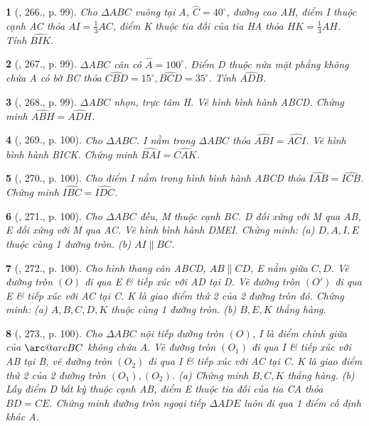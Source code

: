 \documentclass{article}
\makeatletter
\newcommand{\arc@char}{{\usefont{U}{tipa}{m}{n}\symbol{62}}}%
\newcommand{\arc}[1]{\mathpalette\arc@arc{#1}}
\newcommand{\arc@arc}[2]{%
	\sbox0{$\m@th#1#2$}%
	\vbox{
		\hbox{\resizebox{\wd0}{\height}{\arc@char}}
		\nointerlineskip
		\box0
	}%
}
\newtheorem{baitoan}{}
\makeatother
\begin{document}
\begin{baitoan}[\cite{Binh_Toan_9_tap_2}, 266., p. 99]
	Cho $\Delta ABC$ vuông tại A, $\widehat{C} = 40^\circ$, đường cao AH, điểm I thuộc cạnh AC thỏa $AI = \frac{1}{3}AC$, điểm K thuộc tia đối của tia HA thỏa $HK = \frac{1}{3}AH$. Tính $\widehat{BIK}$.
\end{baitoan}

\begin{baitoan}[\cite{Binh_Toan_9_tap_2}, 267., p. 99]
	$\Delta ABC$ cân có $\widehat{A} = 100^\circ$. Điểm D thuộc nửa mặt phẳng không chứa A có bờ BC thỏa $\widehat{CBD} = 15^\circ,\widehat{BCD} = 35^\circ$. Tính $\widehat{ADB}$.
\end{baitoan}

\begin{baitoan}[\cite{Binh_Toan_9_tap_2}, 268., p. 99]
	$\Delta ABC$ nhọn, trực tâm H. Vẽ hình bình hành ABCD. Chứng minh $\widehat{ABH} = \widehat{ADH}$.
\end{baitoan}

\begin{baitoan}[\cite{Binh_Toan_9_tap_2}, 269., p. 100]
	Cho $\Delta ABC$. I nằm trong $\Delta ABC$ thỏa $\widehat{ABI} = \widehat{ACI}$. Vẽ hình bình hành BICK. Chứng minh $\widehat{BAI} = \widehat{CAK}$.
\end{baitoan}

\begin{baitoan}[\cite{Binh_Toan_9_tap_2}, 270., p. 100]
	Cho điểm I nằm trong hình bình hành ABCD thỏa $\widehat{IAB} = \widehat{ICB}$. Chứng minh $\widehat{IBC} = \widehat{IDC}$.
\end{baitoan}

\begin{baitoan}[\cite{Binh_Toan_9_tap_2}, 271., p. 100]
	Cho $\Delta ABC$ đều, M thuộc cạnh BC. D đối xứng với M qua AB, E đối xứng với M qua AC. Vẽ hình bình hành DMEI. Chứng minh: (a) $D,A,I,E$ thuộc cùng 1 đường tròn. (b) $AI\parallel BC$.
\end{baitoan}

\begin{baitoan}[\cite{Binh_Toan_9_tap_2}, 272., p. 100]
	Cho hình thang cân ABCD, $AB\parallel CD$, E nằm giữa $C,D$. Vẽ đường tròn $(O)$ đi qua E \& tiếp xúc với AD tại D. Vẽ đường tròn $(O')$ đi qua E \& tiếp xúc với AC tại C. K là giao điểm thứ 2 của 2 đường tròn đó. Chứng minh: (a) $A,B,C,D,K$ thuộc cùng 1 đường tròn. (b) $B,E,K$ thẳng hàng.
\end{baitoan}

\begin{baitoan}[\cite{Binh_Toan_9_tap_2}, 273., p. 100]
	Cho $\Delta ABC$ nội tiếp đường tròn $(O)$, I là điểm chính giữa của $\arc{BC}$ không chứa A. Vẽ đường tròn $(O_1)$ đi qua I \& tiếp xúc với AB tại B, vẽ đường tròn $(O_2)$ đi qua I \& tiếp xúc với AC tại C. K là giao điểm thứ 2 của 2 đường tròn $(O_1),(O_2)$. (a) Chứng minh $B,C,K$ thẳng hàng. (b) Lấy điểm D bất kỳ thuộc cạnh AB, điểm E thuộc tia đối của tia CA thỏa $BD = CE$. Chứng minh đường tròn ngoại tiếp $\Delta ADE$ luôn đi qua 1 điểm cố định khác A.
\end{baitoan}
\end{document}
